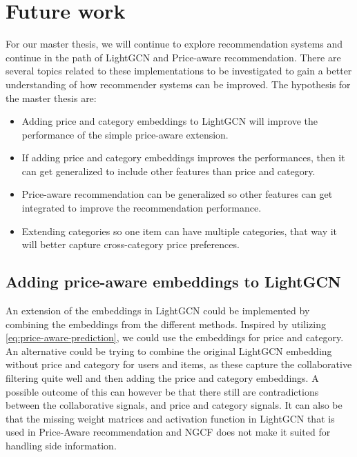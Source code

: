 \section{Future work}
For our master thesis, we will continue to explore recommendation systems and continue in the path of LightGCN and Price-aware recommendation.
There are several topics related to these implementations to be investigated to gain a better understanding of how recommender systems can be improved.
The hypothesis for the master thesis are:
\begin{itemize}
    \item Adding price and category embeddings to LightGCN will improve the performance of the simple price-aware extension.
    \item If adding price and category embeddings improves the performances, then it can get generalized to include other features than price and category.
    \item Price-aware recommendation can be generalized so other features can get integrated to improve the recommendation performance.
    \item Extending categories so one item can have multiple categories, that way it will better capture cross-category price preferences.
\end{itemize}

\subsection{Adding price-aware embeddings to LightGCN}
An extension of the embeddings in LightGCN could be implemented by combining the embeddings from the different methods.
Inspired by utilizing \autoref{eq:price-aware-prediction}, we could use the embeddings for price and category.
An alternative could be trying to combine the original LightGCN embedding without price and category for users and items, as these capture the collaborative filtering quite well and then adding the price and category embeddings.
A possible outcome of this can however be that there still are contradictions between the collaborative signals, and price and category signals.
It can also be that the missing weight matrices and activation function in LightGCN that is used in Price-Aware recommendation and NGCF does not make it suited for handling side information.

